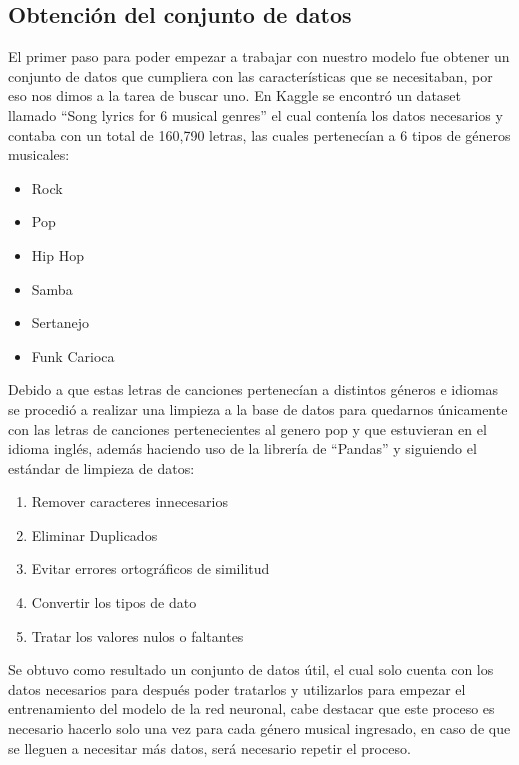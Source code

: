 \subsection{Obtención del conjunto de datos}
El primer paso para poder empezar a trabajar con nuestro modelo fue obtener un conjunto de datos que cumpliera con las características que se necesitaban, por eso nos dimos a la tarea de buscar uno. En Kaggle \cite{kaggle1} se encontró un dataset llamado “Song lyrics for 6 musical genres” \cite{kaggleDataset} el cual contenía los datos necesarios y contaba con un total de 160,790 letras, las cuales pertenecían a 6 tipos de géneros musicales:
\begin{itemize}
	\item Rock
	\item Pop
	\item Hip Hop
	\item Samba
	\item Sertanejo
	\item Funk Carioca
\end{itemize}
Debido a que estas letras de canciones pertenecían a distintos géneros e idiomas se procedió a realizar una limpieza a la base de datos para quedarnos únicamente con las letras de canciones pertenecientes al genero pop y que estuvieran en el idioma inglés, además haciendo uso de la librería de “Pandas” y siguiendo el estándar de limpieza de datos: \cite{data_cleaning}
\begin{enumerate}
	\item Remover caracteres innecesarios
	\item Eliminar Duplicados
	\item Evitar errores ortográficos de similitud
	\item Convertir los tipos de dato
	\item Tratar los valores nulos o faltantes
\end{enumerate}
Se obtuvo como resultado un conjunto de datos útil, el cual solo cuenta con los datos necesarios para después poder tratarlos y utilizarlos para empezar el entrenamiento del modelo de la red neuronal, cabe destacar que este proceso es necesario hacerlo solo una vez para cada género musical ingresado, en caso de que se lleguen a necesitar más datos, será necesario repetir el proceso.
